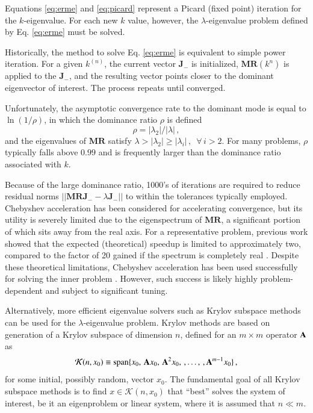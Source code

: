Equations \ref{eq:erme} and \ref{eq:picard} represent
a Picard (fixed point) iteration
for the $k$-eigenvalue.  For each new $k$ value, however, the 
$\lambda$-eigenvalue problem defined by Eq. \ref{eq:erme} must be 
solved.

Historically, the method to solve Eq. \ref{eq:erme} is equivalent to 
simple power iteration.
For a given $k^{(n)}$, the current vector $\mathbf{J}_{-}$ is 
initialized,
$\mathbf{MR}(k^{n})$ is applied to the $\mathbf{J}_{-}$, and the resulting 
vector points closer to the dominant eigenvector of interest.  
The process repeats until converged. 

Unfortunately, the asymptotic convergence rate to the dominant mode is 
equal to $\ln{(1/\rho)}$, in which the dominance ratio $\rho$  is defined
\begin{equation}
 \rho = |\lambda_2| / |\lambda| \, ,
\end{equation}
and the eigenvalues of 
$\mathbf{M}\mathbf{R}$ satisfy 
$\lambda > |\lambda_2| \geq |\lambda_i| \, , \,\,\, \forall \, i > 2$.  
For many problems, $\rho$ typically falls 
above $0.99$ and is frequently larger than the dominance 
ratio associated with $k$.

Because of the large dominance ratio, 1000's of iterations are required 
to reduce residual norms $||\mathbf{MRJ}_- - \lambda \mathbf{J}_-||$ to 
within the tolerances typically employed. 
Chebyshev acceleration 
has been considered for accelerating convergence, but its utility is severely 
limited due to the eigenspectrum of $\mathbf{MR}$, a 
significant portion of which sits away from the real axis.  
For a representative problem, previous work 
showed that the expected (theoretical) speedup is limited to 
approximately two, compared to the factor of 20 gained if the spectrum is
completely real \cite{roberts2012ksi}.
Despite these theoretical limitations, 
Chebyshev acceleration has been used successfully for solving the inner 
problem \cite{zhang2012ehs}.  However, such success is likely highly 
problem-dependent and subject to significant tuning.

Alternatively,
more efficient eigenvalue solvers such as Krylov subspace 
methods can be used for the $\lambda$-eigenvalue problem.  
Krylov methods are based on generation
of a Krylov subspace of dimension $n$, 
defined for an $m \times m$ operator $\mathbf{A}$ as
\begin{equation}
 \mathcal{K}(n,x_0) \equiv \text{span} 
     \{x_0,\, \mathbf{A}x_0,\, \mathbf{A}^2x_0,\, 
         ,\ldots,\,, \mathbf{A}^{m-1}x_0 \} \, , 
 \label{eq:krylovsubspace}
\end{equation}
for some initial, possibly random, vector $x_0$.  The fundamental 
goal of all Krylov subspace methods is to find  $x \in \mathcal{K}(n,x_0)$  
that ``best'' solves the system of interest, be it an 
eigenproblem or linear system, where it is assumed that $n \ll m$.

